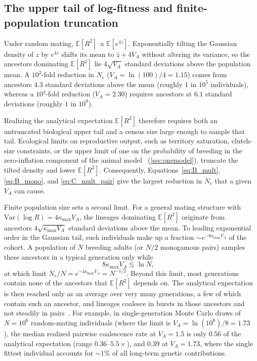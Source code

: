 \documentclass{article}
\begin{document}
\subsection{The upper tail of log-fitness and finite-population truncation}\label{app:B_tail}
Under random mating, $\mathbb{E}[R^2] \propto \mathbb{E}[e^{4z}]$. Exponentially tilting the Gaussian density of $z$ by $e^{4z}$ shifts its mean to $\bar{z} + 4V_A$ without altering its variance, so the ancestors dominating $\mathbb{E}[R^2]$ lie $4\sqrt{V_A}$ standard deviations above the population mean. A $10^2$-fold reduction in $N_e$ ($V_A = \ln(100)/4 = 1.15$) comes from ancestors $4.3$ standard deviations above the mean (roughly $1$ in $10^5$ individuals), whereas a $10^4$-fold reduction ($V_A = 2.30$) requires ancestors at $6.1$ standard deviations (roughly $1$ in $10^9$).

Realizing the analytical expectation $\mathbb{E}[R^2]$ therefore requires both an untruncated biological upper tail and a census size large enough to sample that tail. Ecological limits on reproductive output, such as territory saturation, clutch-size constraints, or the upper limit of one on the probability of breeding in the zero-inflation component of the animal model~\cite{bonnet2022} (\autoref{sec:onemodel}), truncate the tilted density and lower $\mathbb{E}[R^2]$. Consequently, Equations~\eqref{eq:B_mult}, \eqref{eq:B_mono}, and \eqref{eq:C_mult_pair} give the largest reduction in $N_e$ that a given $V_A$ can cause.

Finite population size sets a second limit. For a general mating structure with $\mathrm{Var}(\log R) = 4\kappa_{\max}V_A$, the lineages dominating $\mathbb{E}[R^2]$ originate from ancestors $4\sqrt{\kappa_{\max}V_A}$ standard deviations above the mean. To leading exponential order in the Gaussian tail, such individuals make up a fraction $\sim e^{-8\kappa_{\max}V_A}$ of the cohort. A population of $N$ breeding adults (or $N/2$ monogamous pairs) samples these ancestors in a typical generation only while
\begin{equation}
    8\kappa_{\max}V_A \lesssim \ln N, \label{eq:B_tail_limit}
\end{equation}
at which limit $N_e/N = e^{-4\kappa_{\max}V_A} = N^{-1/2}$. Beyond this limit, most generations contain none of the ancestors that $\mathbb{E}[R^2]$ depends on. The analytical expectation is then reached only as an average over very many generations, a few of which contain such an ancestor, and lineages coalesce in bursts in those ancestors and not steadily in pairs~\cite{eldon2006,neher2013,diamantidis2024}. For example, in single-generation Monte Carlo draws of $N = 10^6$ random-mating individuals (where the limit is $V_A = \ln(10^6)/8 = 1.73$), the median realized pairwise coalescence rate at $V_A = 1.5$ is only $0.56$ of the analytical expectation (range $0.36$--$5.5\times$), and $0.39$ at $V_A = 1.73$, where the single fittest individual accounts for $\sim 1\%$ of all long-term genetic contributions.
\end{document}
